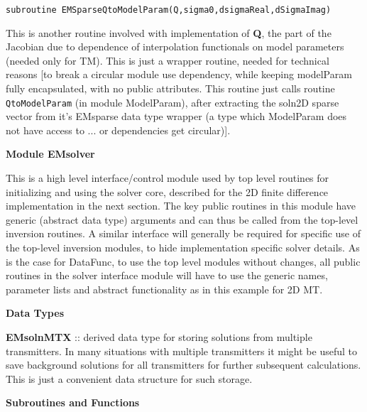 \documentclass[12pt]{article}
\begin{document}
\begin{verbatim}
subroutine EMSparseQtoModelParam(Q,sigma0,dsigmaReal,dSigmaImag)
\end{verbatim}

This is another routine involved with implementation of {\bf Q},
the part of the Jacobian due to dependence of interpolation
functionals on model parameters (needed only for TM).
This is just a wrapper routine,
needed for technical reasons [to break a circular module use
dependency, while keeping modelParam fully encapsulated, with no public
attributes.  This routine just calls routine \verb|QtoModelParam|
(in module ModelParam), after extracting the soln2D sparse 
vector from it's EMsparse data type wrapper (a type which ModelParam 
does not have access to ... or dependencies get circular)].

\vspace{10pt}

\noindent
{\bf Module EMsolver}

This is a high level interface/control module used by top level routines
for initializing and using the solver core, described for
the 2D finite difference implementation in the next section.
The key public routines in this module have generic 
(abstract data type) arguments
and can thus be called from the top-level inversion routines.
A similar interface will generally be required for specific use
of the top-level inversion modules, to hide implementation
specific solver details.  As is the case for DataFunc,
to use the top level modules without
changes, all public routines in the solver interface module
will have to use the generic names,  parameter lists
and abstract functionality as in this example for 2D MT.

\vspace{10pt}

\noindent
{\bf Data Types}

\vspace{6pt}

\noindent
{\bf EMsolnMTX} :: derived data type for storing solutions from multiple
transmitters.  In many situations with multiple transmitters it might
be useful to save background solutions for all transmitters for
further subsequent calculations.  This is just a convenient data
structure for such storage.

\vspace{10pt}

\noindent
{\bf Subroutines and Functions}

\vspace{6pt}
\end{document}
